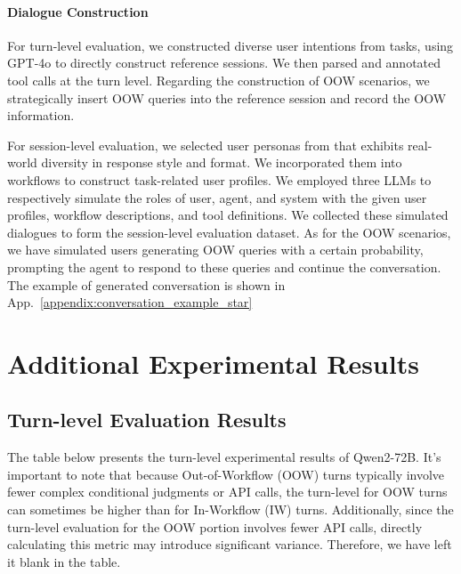 \begin{envnew}
\paragraph{Dialogue Construction}
For {turn-level evaluation}, we constructed diverse user intentions from tasks, using GPT-4o to directly construct reference sessions. We then parsed and annotated tool calls at the turn level. Regarding the construction of OOW scenarios, we strategically insert OOW queries into the reference session and record the OOW information.


For {session-level evaluation}, we selected user personas from \citet{persona-hub} that exhibits real-world diversity in response style and format.
We incorporated them into workflows to construct task-related user profiles.
We employed three LLMs to respectively simulate the roles of user, agent, and system with the given user profiles, workflow descriptions, and tool definitions.
We collected these simulated dialogues to form the session-level evaluation dataset.
As for the OOW scenarios, we have simulated users generating OOW queries with a certain probability, prompting the agent to respond to these queries and continue the conversation.
The example of generated conversation is shown in App.~\ref{appendix:conversation_example_star}

\section{Additional Experimental Results} \label{appendix:experimental_results}

\subsection{Turn-level Evaluation Results} \label{appendix:turn_level_results}
The table below presents the turn-level experimental results of Qwen2-72B. It's important to note that because Out-of-Workflow (OOW) turns typically involve fewer complex conditional judgments or API calls, the turn-level  for OOW turns can sometimes be higher than for In-Workflow (IW) turns. Additionally, since the turn-level evaluation for the OOW portion involves fewer API calls, directly calculating this metric may introduce significant variance. Therefore, we have left it blank in the table.
\tableExpTurn



\end{envnew}


